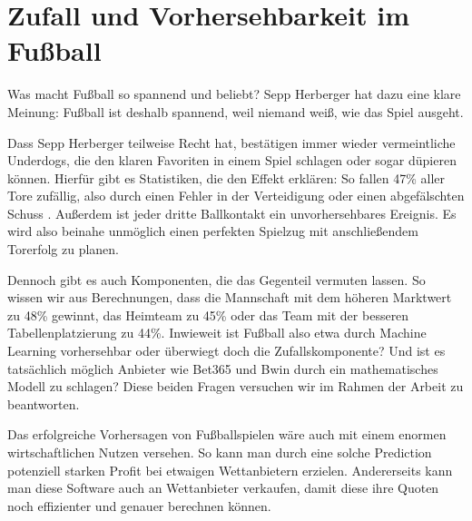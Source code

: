 \chapter{Zufall und Vorhersehbarkeit im Fußball}
	
Was macht Fußball so spannend und beliebt? Sepp Herberger hat dazu eine klare Meinung:
\glqq Fußball ist deshalb spannend, weil niemand weiß, wie das Spiel ausgeht.\grqq 

Dass Sepp Herberger teilweise Recht hat, bestätigen immer wieder vermeintliche Underdogs, die den klaren Favoriten in einem Spiel schlagen oder sogar düpieren können. Hierfür gibt es Statistiken, die den Effekt erklären: So fallen 47\% aller Tore zufällig, also durch einen Fehler in der Verteidigung oder einen abgefälschten Schuss \autocite[Vgl.][]{.06102018}. Außerdem ist jeder dritte Ballkontakt ein unvorhersehbares Ereignis. Es wird also beinahe unmöglich einen perfekten Spielzug mit anschließendem Torerfolg zu planen. \autocite[Vgl.][]{.}

Dennoch gibt es auch Komponenten, die das Gegenteil vermuten lassen.
So wissen wir aus Berechnungen, dass die Mannschaft mit dem höheren Marktwert zu 48\% gewinnt, das Heimteam zu 45\% oder das Team mit der besseren Tabellenplatzierung zu 44\%. 
Inwieweit ist Fußball also etwa durch Machine Learning vorhersehbar oder überwiegt doch die Zufallskomponente? Und ist es tatsächlich möglich Anbieter wie Bet365 und Bwin durch ein mathematisches Modell zu schlagen? Diese beiden Fragen versuchen wir im Rahmen der Arbeit zu beantworten.

Das erfolgreiche Vorhersagen von Fußballspielen wäre auch mit einem enormen wirtschaftlichen Nutzen versehen. So kann man durch eine solche Prediction potenziell starken Profit bei etwaigen Wettanbietern erzielen. Andererseits kann man diese Software auch an Wettanbieter verkaufen, damit diese ihre Quoten noch effizienter und genauer berechnen können.


